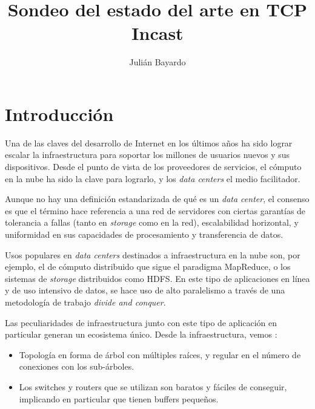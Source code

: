 \documentclass[runningheads,a4paper]{llncs}
\begin{document}

\title{Sondeo del estado del arte en TCP Incast}
\author{Julián Bayardo}



\maketitle

\newpage

\tableofcontents

\newpage

\section{Introducción}

Una de las claves del desarrollo de Internet en los últimos años ha sido lograr escalar la infraestructura para soportar los millones de usuarios nuevos y sus dispositivos. Desde el punto de vista de los proveedores de servicios, el cómputo en la nube ha sido la clave para lograrlo, y los \textit{data centers} el medio facilitador.

Aunque no hay una definición estandarizada de qué es un \textit{data center}, el consenso es que el término hace referencia a una red de servidores con ciertas garantías de tolerancia a fallas (tanto en \textit{storage} como en la red), escalabilidad horizontal, y uniformidad en sus capacidades de procesamiento y transferencia de datos.

Usos populares en \textit{data centers} destinados a infraestructura en la nube son, por ejemplo, el de cómputo distribuido que sigue el paradigma MapReduce\cite{Dean_MapReduce_2004}, o los sistemas de \textit{storage} distribuidos como HDFS\cite{Shvachko_HDFS_2010}. En este tipo de aplicaciones en línea y de uso intensivo de datos, se hace uso de alto paralelismo a través de una metodología de trabajo \textit{divide and conquer}.

Las peculiaridades de infraestructura junto con este tipo de aplicación en particular generan un ecosistema único. Desde la infraestructura, vemos \cite{Benson_Network_2010}:

\begin{itemize}
\item Topología en forma de árbol con múltiples raíces, y regular en el número de conexiones con los sub-árboles.

\item Los switches y routers que se utilizan son baratos y fáciles de conseguir, implicando en particular que tienen buffers pequeños.
\end{itemize}
\end{document}
